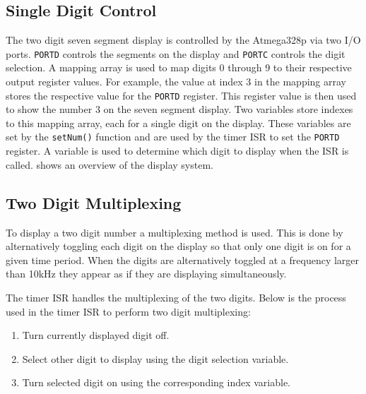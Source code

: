 \documentclass[main.tex]{subfiles}
\begin{document}
		\subsection{Single Digit Control}

		The two digit seven segment display is controlled by the Atmega328p via two
		I/O ports. \lstinline{PORTD} controls the segments on the display and
		\lstinline{PORTC} controls the digit selection. A mapping array is used to
		map digits 0 through 9 to their respective output register values. For
		example, the value at index 3 in the mapping array stores the respective
		value for the \lstinline{PORTD} register. This register value is then used
		to show the number 3 on the seven segment display. Two variables store
		indexes to this mapping array, each for a single digit on the display. These
		variables are set by the \lstinline{setNum()} function and are used by the
		timer ISR to set the \lstinline{PORTD} register. A variable is used to
		determine which digit to display when the ISR is called.
		 shows an overview of the display system.

		\subsection{Two Digit Multiplexing}
		To display a two digit number a multiplexing method is used. This is done by
		alternatively toggling each digit on the display so that only one digit is
		on for a given time period. When the digits are alternatively toggled at a
		frequency larger than 10kHz they appear as if they are displaying
		simultaneously. 

		The timer ISR handles the multiplexing of the two digits. Below is the
		process used in the timer ISR to perform two digit multiplexing: 

		\begin{enumerate}
			\item Turn currently displayed digit off.
			\item Select other digit to display using the digit selection variable.
			\item Turn selected digit on using the corresponding index variable.
		\end{enumerate}
\end{document}
